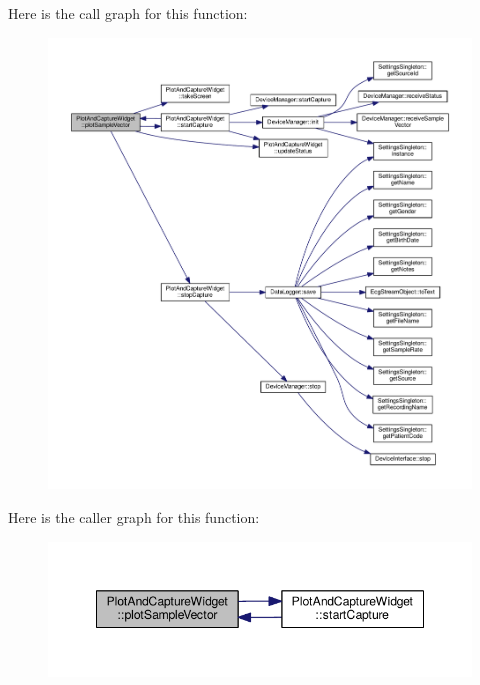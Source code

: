 Here is the call graph for this function\+:
\nopagebreak
\begin{figure}[H]
\begin{center}
\leavevmode
\includegraphics[width=350pt]{classPlotAndCaptureWidget_a7dca31208a65906f0a96bf4143e0da4f_cgraph}
\end{center}
\end{figure}




Here is the caller graph for this function\+:
\nopagebreak
\begin{figure}[H]
\begin{center}
\leavevmode
\includegraphics[width=348pt]{classPlotAndCaptureWidget_a7dca31208a65906f0a96bf4143e0da4f_icgraph}
\end{center}
\end{figure}


